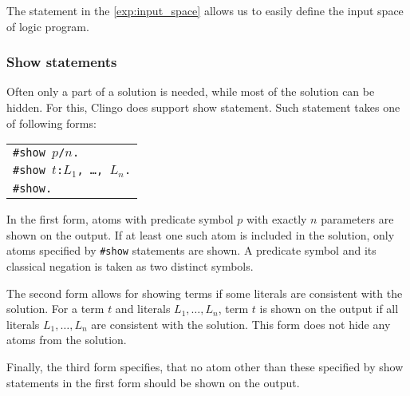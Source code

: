 The statement in the \cref{exp:input_space} allows us to easily define the input space
of logic program.

\subsubsection{Show statements}

Often only a part of a solution is needed, while most of the solution can be hidden.
For this, Clingo does support show statement. Such statement takes one of following forms:
\begin{center}
    \begin{tabular}{l}
        \texttt{\#show $p$/$n$.}\\
        \texttt{\#show $t$:$L_1$, \ldots, $L_n$.}\\
        \texttt{\#show.}
    \end{tabular}
\end{center}

In the first form, atoms with predicate symbol $p$ with exactly $n$ parameters
are shown on the output. If at least one such atom is included in the solution,
only atoms specified by \texttt{\#show} statements are shown.
A predicate symbol and its classical negation is taken as two distinct symbols.

The second form allows for showing terms if some literals are consistent with the solution.
For a term $t$ and literals $L_1, \ldots, L_n$, term $t$ is shown on the output
if all literals $L_1, \ldots, L_n$ are consistent with the solution.
This form does not hide any atoms from the solution.

Finally, the third form specifies, that no atom other than these specified by
show statements in the first form should be shown on the output.

